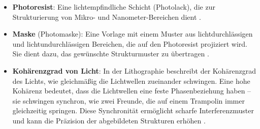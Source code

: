 \documentclass{article} %
\begin{document}
\begin{itemize}
    \item \textbf{Photoresist}: Eine lichtempfindliche Schicht (Photolack), die zur Strukturierung von Mikro- und Nanometer-Bereichen dient \cite{madou2002}.
    \item \textbf{Maske} (Photomaske): Eine Vorlage mit einem Muster aus lichtdurchlässigen und lichtundurchlässigen Bereichen, die auf den Photoresist projiziert wird. Sie dient dazu, das gewünschte Strukturmuster zu übertragen \cite{wolf2000}.
    \item \textbf{Kohärenzgrad von Licht}: In der Lithographie beschreibt der Kohärenzgrad des Lichts, wie gleichmäßig die Lichtwellen zueinander schwingen. Eine hohe Kohärenz bedeutet, dass die Lichtwellen eine feste Phasenbeziehung haben -- sie schwingen synchron, wie zwei Freunde, die auf einem Trampolin immer gleichzeitig springen. Diese Synchronität ermöglicht scharfe Interferenzmuster und kann die Präzision der abgebildeten Strukturen erhöhen \cite{Mack2006, BornWolf1999}.


\end{itemize}
\end{document}
